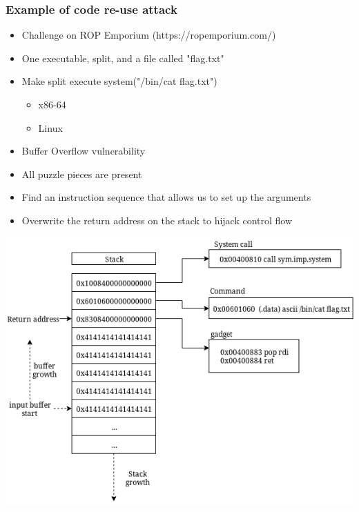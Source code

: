 \begin{frame}
	\frametitle{Example of code re-use attack}

	\begin{itemize}
		\item Challenge on ROP Emporium (https://ropemporium.com/)
		\item One executable, split, and a file called "flag.txt"
		\item Make split execute system("/bin/cat flag.txt")
			\begin{itemize}
				\item x86-64
				\item Linux
			\end{itemize}
	\end{itemize}

	\vspace{0.5cm}

	\begin{itemize}
		\item	Buffer Overflow vulnerability
		\item All puzzle pieces are present
		\item	Find an instruction sequence that allows us to set up the arguments
		\item	Overwrite the return address on the stack to hijack control flow
	\end{itemize}

\end{frame}

\begin{frame}
	\includegraphics[width=\textwidth]{../background/software-diversity/figures/after-payload}
\end{frame}
